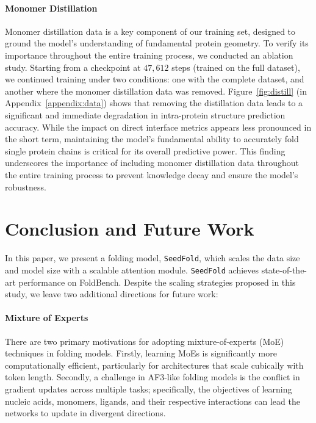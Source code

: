 \documentclass[]{bytedance_seed}
\newcommand{\todoq}[2][]{\todo[size=\scriptsize,color=orange!20!white,#1]{Quanquan: #2}}
\begin{document}
\paragraph{Monomer Distillation}
Monomer distillation data is a key component of our training set, designed to ground the model's understanding of fundamental protein geometry. To verify its importance throughout the entire training process, we conducted an ablation study. Starting from a checkpoint at $47,612$ steps (trained on the full dataset), we continued training under two conditions: one with the complete dataset, and another where the monomer distillation data was removed. Figure~\ref{fig:distill} (in Appendix~\ref{appendix:data}) shows that removing the distillation data leads to a significant and immediate degradation in intra-protein structure prediction accuracy. While the impact on direct interface metrics appears less pronounced in the short term, maintaining the model's fundamental ability to accurately fold single protein chains is critical for its overall predictive power. This finding underscores the importance of including monomer distillation data throughout the entire training process to prevent knowledge decay and ensure the model's robustness.




\section{Conclusion and Future Work}

In this paper, we present a folding model, \texttt{SeedFold}, which scales the data size and model size with a scalable attention module. \texttt{SeedFold} achieves state-of-the-art performance on FoldBench. Despite the scaling strategies proposed in this study, we leave two additional directions for future work:



\paragraph{Mixture of Experts} There are two primary motivations for adopting mixture-of-experts (MoE) techniques in folding models. Firstly, learning MoEs is significantly more computationally efficient, particularly for architectures that scale cubically with token length. Secondly, a challenge in AF3-like folding models is the conflict in gradient updates across multiple tasks; specifically, the objectives of learning nucleic acids, monomers, ligands, and their respective interactions can lead the networks to update in divergent directions.
\end{document}
